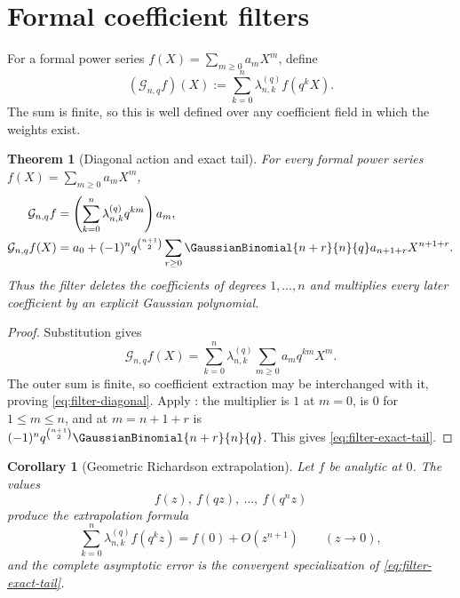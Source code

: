 \documentclass[11pt,a4paper,oneside,openany]{book}
\newtheorem{theorem}{Theorem}[chapter]
\newtheorem{corollary}[corollary]{Corollary}
\theoremstyle{definition}
\theoremstyle{remark}
\begin{document}
\section{Formal coefficient filters}

For a formal power series $f(X)=\sum_{m\ge0}a_mX^m$, define
\begin{equation}\label{eq:geometric-filter-definition}
 (\mathcal G_{n,q}f)(X)
 :=\sum_{k=0}^{n}\lambda_{n,k}^{(q)}f(q^kX).
\end{equation}
The sum is finite, so this is well defined over any coefficient field in which the weights exist.

\begin{theorem}[Diagonal action and exact tail]\label{thm:geometric-filter-diagonal}
For every formal power series $f(X)=\sum_{m\ge0}a_mX^m$,
\begin{align}
 [X^m]\mathcal G_{n,q}f
 &=\left(\sum_{k=0}^{n}\lambda_{n,k}^{(q)}q^{km}\right)a_m,
 \label{eq:filter-diagonal}\\
 \mathcal G_{n,q}f(X)
 &=a_0+(-1)^nq^{\binom{n+1}{2}}
   \sum_{r\ge0}\GaussianBinomial{n+r}{n}{q}a_{n+1+r}X^{n+1+r}.
 \label{eq:filter-exact-tail}
\end{align}
Thus the filter deletes the coefficients of degrees $1,\ldots,n$ and multiplies every later coefficient by an explicit Gaussian polynomial.
\end{theorem}

\begin{proof}
Substitution gives
\[
 \mathcal G_{n,q}f(X)
 =\sum_{k=0}^{n}\lambda_{n,k}^{(q)}
   \sum_{m\ge0}a_mq^{km}X^m.
\]
The outer sum is finite, so coefficient extraction may be interchanged with it, proving \eqref{eq:filter-diagonal}.  Apply : the multiplier is $1$ at $m=0$, is $0$ for $1\le m\le n$, and at $m=n+1+r$ is
$(-1)^nq^{\binom{n+1}{2}}\GaussianBinomial{n+r}{n}{q}$.  This gives \eqref{eq:filter-exact-tail}.
\end{proof}

\begin{corollary}[Geometric Richardson extrapolation]\label{cor:geometric-richardson}
Let $f$ be analytic at $0$.  The values
\[
 f(z),\ f(qz),\ \ldots,\ f(q^nz)
\]
produce the extrapolation formula
\[
 \sum_{k=0}^{n}\lambda_{n,k}^{(q)}f(q^kz)
 =f(0)+O(z^{n+1})
 \qquad(z\to0),
\]
and the complete asymptotic error is the convergent specialization of
\eqref{eq:filter-exact-tail}.
\end{corollary}
\end{document}
